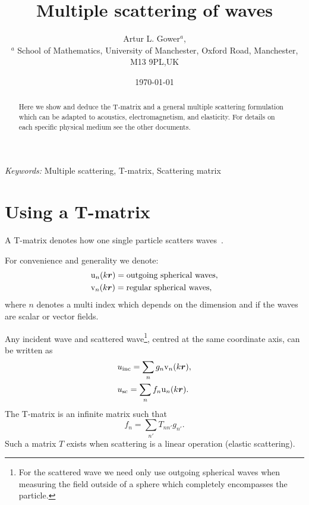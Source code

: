 \documentclass[ 12pt, a4paper]{article}
\begin{document}
\title{Multiple scattering of waves}
\author{
Artur L. Gower$^{a}$,\\
\footnotesize{$^{a}$ School of Mathematics, University of Manchester, Oxford Road, Manchester, M13 9PL,UK}
}
\date{\today}
\maketitle

\begin{abstract}
Here we show and deduce the T-matrix and a general multiple scattering formulation which can be adapted to acoustics, electromagnetism, and elasticity. For details on each specific physical medium see the other documents.
\end{abstract}

\noindent
{\textit{Keywords:} Multiple scattering, T-matrix, Scattering matrix}

\section{Using a T-matrix}
A T-matrix denotes how one single particle scatters waves~\parencite{ganesh_far-field_2010,ganesh_algorithm_2017}.

For convenience and generality we denote:
\begin{equation}
\begin{aligned}
    & \mathrm u_{n}(k\boldsymbol{r}) = \text{outgoing spherical waves},
    \label{eqn:outgoing_waves_and_regular_waves}
    \\
    & \mathrm v_{n}(k\boldsymbol{r})= \text{regular spherical waves},
 \end{aligned}
\end{equation}
where $n$ denotes a multi index which depends on the dimension and if the waves are scalar or vector fields.

Any incident wave and scattered wave\footnote{For the scattered wave we need only use outgoing spherical waves when measuring the field outside of a sphere which completely encompasses the particle.}, centred at the same coordinate axis, can be written as
\begin{align}
  & u_{\mathrm{inc}} = \sum_{n} g_n \mathrm v_{n}(k\boldsymbol{r}),
  \\
  & u_{\mathrm{sc}} = \sum_{n} f_n \mathrm u_{n}(k\boldsymbol{r}).
\end{align}
The T-matrix is an infinite matrix such that
\begin{equation}
  f_n = \sum_{n'} T_{nn'} g_{n'}.
\end{equation}
Such a matrix $T$ exists when scattering is a linear operation (elastic scattering).
\end{document}

